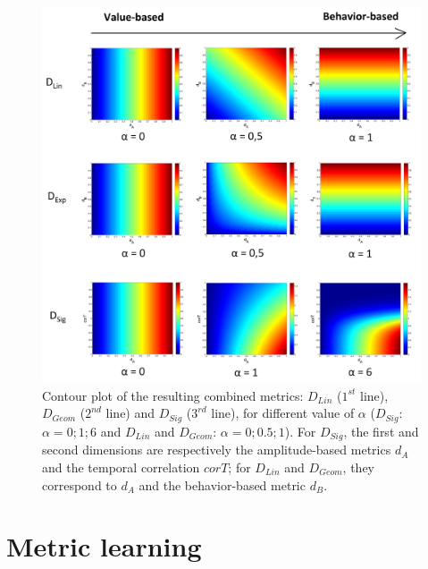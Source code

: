 \begin{figure}[h!]
	\centering
	\includegraphics[width=1\linewidth]{images/CombinedMetrics}
	\caption{Contour plot of the resulting combined metrics: $D_{Lin}$ ($1^{st}$ line), $D_{Geom}$ ($2^{nd}$ line) and $D_{Sig}$ ($3^{rd}$ line), for different value of $\alpha$ ($D_{Sig}$: $\alpha=0;1;6$ and $D_{Lin}$ and $D_{Geom}$: $\alpha=0;0.5;1$). For $D_{Sig}$, the first and second dimensions are respectively the amplitude-based metrics $d_A$ and the temporal correlation $corT$; for $D_{Lin}$ and $D_{Geom}$, they correspond to $d_A$ and the behavior-based metric $d_B$.}
	\label{fig:ContourLine}
\end{figure}

\section{Metric learning}

